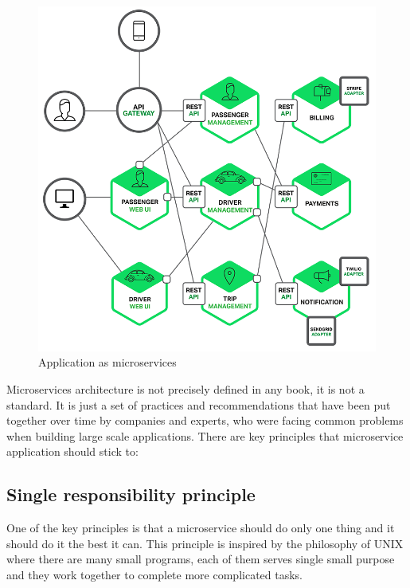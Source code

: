 \documentclass[12pt,oneside]{fithesis2}
\begin{document}
\begin{figure}[ht!]
	\label{microservice_application}
	\centering
	\includegraphics[width=\textwidth]{images/microservice_application2.png}
	\caption{Application as microservices\footnotemark}
\end{figure}


Microservices architecture is not precisely defined in any book, it is not a standard. It is just a set of practices and recommendations that have been put together over time by companies and experts, who were facing common problems when building large scale applications. There are key principles that microservice application should stick to:

\subsection{Single responsibility principle}

One of the key principles is that a microservice should do only one thing and it should do it the best it can. This principle is inspired by the philosophy of UNIX where there are many small programs, each of them serves single small purpose and they work together to complete more complicated tasks.
\end{document}

